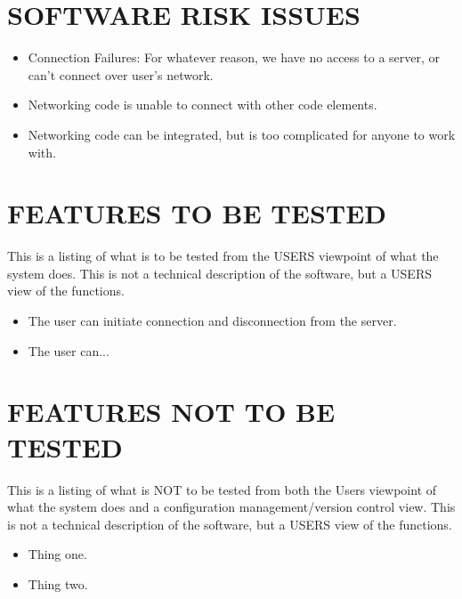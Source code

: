 \section[SOFTWARE RISK ISSUES]{\bfseries\color{black} SOFTWARE RISK ISSUES}

{\color{black}

\begin{itemize}
\item   Connection Failures: For whatever reason, we have no access to a server, or can't connect over user's network.
\item   Networking code is unable to connect with other code elements.
\item   Networking code can be integrated, but is too complicated for anyone to work with.
\end{itemize}

}

\section[FEATURES TO BE TESTED]{\bfseries\color{black} FEATURES TO BE TESTED}
{\itshape\color{black}

This is a listing of what is to be tested from the USERS viewpoint of
what the system does. This is not a technical description of the
software, but a USERS view of the functions.

}
{\color{black}

\begin{itemize}
\item   The user can initiate connection and disconnection from the server.
\item   The user can...
\end{itemize}
  

}

\section[FEATURES NOT TO BE TESTED]{\bfseries\color{black}
	 FEATURES NOT TO BE TESTED}
{\itshape\color{black}

This is a listing of what is NOT to be tested from both the Users
viewpoint of what the system does and a configuration
management/version control view. This is not a technical description
of the software, but a USERS view of the functions.

}
{\color{black}
\begin{itemize}
\item   Thing one.
\item   Thing two.
\end{itemize}
}

